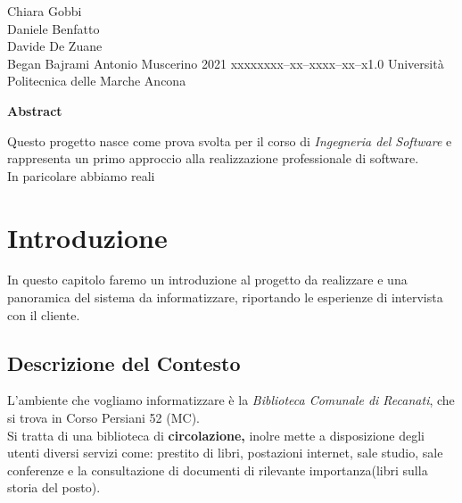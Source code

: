 \documentclass{tstextbook}
\begin{document}
\tsbook{\Huge }
       {Chiara Gobbi \\ Daniele Benfatto \\ Davide De Zuane \\ Began Bajrami}
       {Antonio Muscerino}
       {2021}
       {xxxxx}{xxx--xx--xxxx--xx--x}{1.0}
       {Università Politecnica delle Marche}
       {Ancona}

\begin{center}
	\textbf{\Large Abstract}
\end{center}
Questo progetto nasce come prova svolta per il corso di \textit{Ingegneria del Software} e rappresenta un primo approccio alla realizzazione professionale di software.\\
In paricolare abbiamo reali

\chapter{Introduzione}

\begin{summary}
	In questo capitolo faremo un introduzione al progetto da realizzare e una panoramica del sistema da informatizzare, riportando le esperienze di intervista con il cliente.
\end{summary}

\section{Descrizione del Contesto}
L'ambiente che vogliamo informatizzare è la \textit{Biblioteca Comunale di Recanati}, che si trova in Corso Persiani 52 (MC).\\

Si tratta di una biblioteca di \textbf{circolazione,} inolre mette a disposizione degli utenti diversi servizi come: prestito di libri, postazioni internet, sale studio, sale conferenze e la consultazione di documenti di rilevante importanza(libri sulla storia del posto).\\
\end{document}
